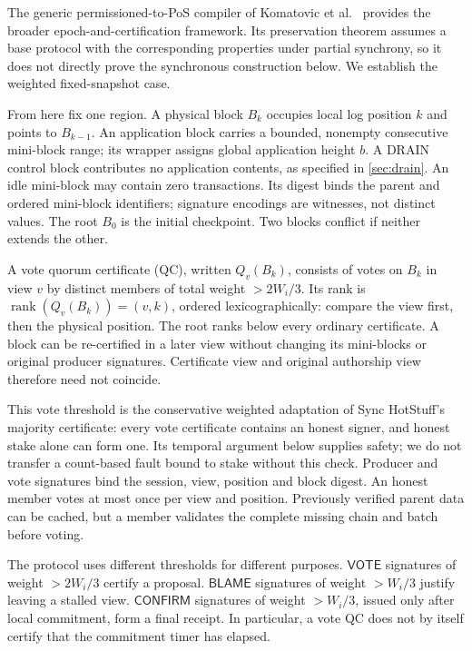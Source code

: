 \documentclass[11pt,a4paper,onecolumn]{article}
\newcommand{\rank}{\operatorname{rank}}
\newcommand{\Tag}[1]{\ensuremath{\mathsf{#1}}}
\newcounter{protocol}
\begin{document}
The generic permissioned-to-PoS compiler of Komatovic et al.~\cite{poscompiler}
provides the broader epoch-and-certification framework. Its preservation
theorem assumes a base protocol with the corresponding properties under
partial synchrony, so it does not directly prove the synchronous construction
below. We establish the weighted fixed-snapshot case.

From here fix one region. A physical block $B_k$ occupies local log position
$k$ and points to $B_{k-1}$. An application block carries a bounded, nonempty
consecutive mini-block range; its wrapper assigns global application height
$b$. A DRAIN control block contributes no application contents, as specified
in \cref{sec:drain}. An idle mini-block may contain zero transactions.
Its digest binds the parent and ordered mini-block identifiers;
signature encodings are witnesses, not distinct values. The root $B_0$ is
the initial checkpoint. Two blocks conflict if neither extends the other.

A vote quorum certificate (QC), written $Q_v(B_k)$, consists of votes on
$B_k$ in view $v$ by distinct members of total weight $>2W_i/3$.
Its rank is $\rank(Q_v(B_k))=(v,k)$, ordered lexicographically:
compare the view first, then the physical position. The root ranks below
every ordinary certificate. A block
can be re-certified in a later view without changing its mini-blocks or
original producer signatures. Certificate view and original authorship view
therefore need not coincide.

This vote threshold is the conservative weighted adaptation of Sync HotStuff's
majority certificate: every vote certificate contains an honest signer, and honest
stake alone can form one. Its temporal argument below supplies safety;
we do not transfer a count-based fault bound to stake without this check.
Producer and vote signatures bind the session, view, position and block
digest. An honest member votes at most once per view and position.
Previously verified parent data can be cached, but a member validates the
complete missing chain and batch before voting.

The protocol uses different thresholds for different purposes.
\Tag{VOTE} signatures of weight $>2W_i/3$ certify a proposal.
\Tag{BLAME} signatures of weight $>W_i/3$ justify leaving a stalled view.
\Tag{CONFIRM} signatures of weight $>W_i/3$, issued only after local
commitment, form a final receipt. In particular, a vote QC does not by
itself certify that the commitment timer has elapsed.
\end{document}

